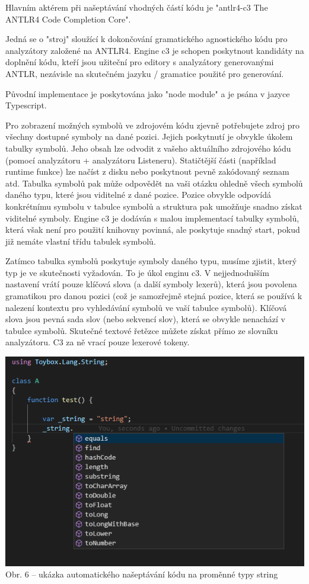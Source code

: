 \documentclass[czech,master,dept460,male,cpp,cpdeclaration]{diploma}
\begin{document}
Hlavním aktérem při našeptávání vhodných částí kódu je "antlr4-c3 The ANTLR4 Code Completion Core".

Jedná se o "stroj" sloužící k dokončování gramatického agnostického kódu pro analyzátory založené na ANTLR4. Engine c3 je schopen poskytnout kandidáty na doplnění kódu, kteří jsou užiteční pro editory s analyzátory generovanými ANTLR, nezávisle na skutečném jazyku / gramatice použité pro generování.

Původní implementace je poskytována jako "node module" a je psána v jazyce Typescript.

Pro zobrazení možných symbolů ve zdrojovém kódu zjevně potřebujete zdroj pro všechny dostupné symboly na dané pozici. Jejich poskytnutí je obvykle úkolem tabulky symbolů. Jeho obsah lze odvodit z vašeho aktuálního zdrojového kódu (pomocí analyzátoru + analyzátoru Listeneru). Statičtější části (například runtime funkce) lze načíst z disku nebo poskytnout pevně zakódovaný seznam atd. Tabulka symbolů pak může odpovědět na vaši otázku ohledně všech symbolů daného typu, které jsou viditelné z dané pozice. Pozice obvykle odpovídá konkrétnímu symbolu v tabulce symbolů a struktura pak umožňuje snadno získat viditelné symboly. Engine c3 je dodáván s malou implementací tabulky symbolů, která však není pro použití knihovny povinná, ale poskytuje snadný start, pokud již nemáte vlastní třídu tabulek symbolů.

Zatímco tabulka symbolů poskytuje symboly daného typu, musíme zjistit, který typ je ve skutečnosti vyžadován. To je úkol enginu c3. V nejjednodušším nastavení vrátí pouze klíčová slova (a další symboly lexerů), která jsou povolena gramatikou pro danou pozici (což je samozřejmě stejná pozice, která se používá k nalezení kontextu pro vyhledávání symbolů ve vaší tabulce symbolů). Klíčová slova jsou pevná sada slov (nebo sekvencí slov), která se obvykle nenachází v tabulce symbolů. Skutečné textové řetězce můžete získat přímo ze slovníku analyzátoru. C3 za ně vrací pouze lexerové tokeny.


\begin{center}
	\includegraphics[scale=1]{autocomplete_example}
	\\	
	Obr. 6 – ukázka automatického našeptávání kódu na proměnné typy string
\end{center}
\end{document}
